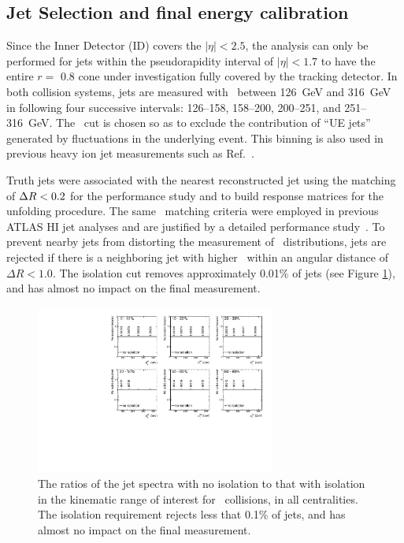 \subsection{Jet Selection and final energy calibration}
\label{Sec:JetSelection}
Since the Inner Detector (ID) covers the $|\eta| < 2.5$, the analysis can only be performed for jets within the pseudorapidity interval of $|\eta| < 1.7$ to have the entire $ r = $ 0.8 cone under investigation fully covered by the tracking detector.
In both collision systems, jets are measured with \ptjet\ between 126~GeV and 316~GeV in following four successive intervals: 126--158, 158--200, 200--251, and 251--316~GeV.
The \ptjet\ cut is chosen so as to exclude the contribution of ``UE jets'' generated by fluctuations in the underlying event.
This binning is also used in previous heavy ion jet measurements such as Ref.~\cite{PhysRevC.98.024908}.

Truth jets were associated with the nearest reconstructed jet using the matching of $\mbox{$\Delta R$}<0.2$ for the performance study and to build response matrices for the unfolding procedure.
The same \dR\ matching criteria were employed in previous ATLAS HI jet analyses and are justified by a detailed performance study~\cite{ATLAS-COM-PHYS-2011-1733}.
To prevent nearby jets from distorting the measurement of \Dptr\ distributions, jets are rejected if there is a neighboring jet with higher \ptjet\ within an angular distance of $\Delta R < 1.0$.
The isolation cut removes approximately 0.01\% of jets (see Figure \ref{fig:ISO}), and has almost no impact on the final measurement.

\begin{figure}
\centering
\includegraphics[width=0.70\textwidth]{figures/main/performance/jet_iso.pdf}
\caption{The ratios of the jet spectra with no isolation to that with isolation in the kinematic range of interest for \pbpb\ collisions, in all centralities.
The isolation requirement rejects less that 0.1\% of jets, and has almost no impact on the final measurement.}
\label{fig:ISO}
\end{figure}  

